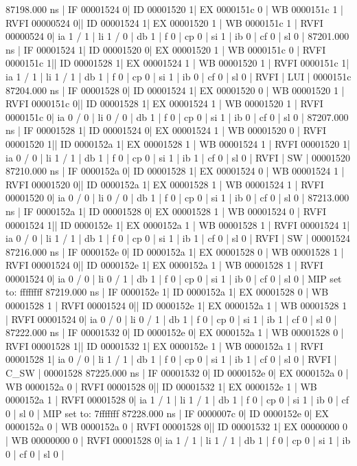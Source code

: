 \begin{terminal}
   87198.000 ns | IF 00001524  0| ID 00001520 1| EX 0000151c 0 | WB 0000151c 1 | RVFI 00000524 0|| ID 00001524  1| EX 00001520 1 | WB 0000151c 1 | RVFI 00000524 0| ia 1 / 1 | li 1 / 0 | db 1 | f 0 | cp 0 | si 1 | ib 0 | cf 0 | sl 0 |
   87201.000 ns | IF 00001524  1| ID 00001520 0| EX 00001520 1 | WB 0000151c 0 | RVFI 0000151c 1|| ID 00001528  1| EX 00001524 1 | WB 00001520 1 | RVFI 0000151c 1| ia 1 / 1 | li 1 / 1 | db 1 | f 0 | cp 0 | si 1 | ib 0 | cf 0 | sl 0 | RVFI | LUI      | 0000151c
   87204.000 ns | IF 00001528  0| ID 00001524 1| EX 00001520 0 | WB 00001520 1 | RVFI 0000151c 0|| ID 00001528  1| EX 00001524 1 | WB 00001520 1 | RVFI 0000151c 0| ia 0 / 0 | li 0 / 0 | db 1 | f 0 | cp 0 | si 1 | ib 0 | cf 0 | sl 0 |
   87207.000 ns | IF 00001528  1| ID 00001524 0| EX 00001524 1 | WB 00001520 0 | RVFI 00001520 1|| ID 0000152a  1| EX 00001528 1 | WB 00001524 1 | RVFI 00001520 1| ia 0 / 0 | li 1 / 1 | db 1 | f 0 | cp 0 | si 1 | ib 1 | cf 0 | sl 0 | RVFI | SW       | 00001520
   87210.000 ns | IF 0000152a  0| ID 00001528 1| EX 00001524 0 | WB 00001524 1 | RVFI 00001520 0|| ID 0000152a  1| EX 00001528 1 | WB 00001524 1 | RVFI 00001520 0| ia 0 / 0 | li 0 / 0 | db 1 | f 0 | cp 0 | si 1 | ib 0 | cf 0 | sl 0 |
   87213.000 ns | IF 0000152a  1| ID 00001528 0| EX 00001528 1 | WB 00001524 0 | RVFI 00001524 1|| ID 0000152e  1| EX 0000152a 1 | WB 00001528 1 | RVFI 00001524 1| ia 0 / 0 | li 1 / 1 | db 1 | f 0 | cp 0 | si 1 | ib 1 | cf 0 | sl 0 | RVFI | SW       | 00001524
   87216.000 ns | IF 0000152e  0| ID 0000152a 1| EX 00001528 0 | WB 00001528 1 | RVFI 00001524 0|| ID 0000152e  1| EX 0000152a 1 | WB 00001528 1 | RVFI 00001524 0| ia 0 / 0 | li 0 / 1 | db 1 | f 0 | cp 0 | si 1 | ib 0 | cf 0 | sl 0 |
MIP set to: ffffffff
   87219.000 ns | IF 0000152e  1| ID 0000152a 1| EX 00001528 0 | WB 00001528 1 | RVFI 00001524 0|| ID 0000152e  1| EX 0000152a 1 | WB 00001528 1 | RVFI 00001524 0| ia 0 / 0 | li 0 / 1 | db 1 | f 0 | cp 0 | si 1 | ib 1 | cf 0 | sl 0 |
   87222.000 ns | IF 00001532  0| ID 0000152e 0| EX 0000152a 1 | WB 00001528 0 | RVFI 00001528 1|| ID 00001532  1| EX 0000152e 1 | WB 0000152a 1 | RVFI 00001528 1| ia 0 / 0 | li 1 / 1 | db 1 | f 0 | cp 0 | si 1 | ib 1 | cf 0 | sl 0 | RVFI | C_SW     | 00001528
   87225.000 ns | IF 00001532  0| ID 0000152e 0| EX 0000152a 0 | WB 0000152a 0 | RVFI 00001528 0|| ID 00001532  1| EX 0000152e 1 | WB 0000152a 1 | RVFI 00001528 0| ia 1 / 1 | li 1 / 1 | db 1 | f 0 | cp 0 | si 1 | ib 0 | cf 0 | sl 0 |
MIP set to: 7fffffff
   87228.000 ns | IF 0000007c  0| ID 0000152e 0| EX 0000152a 0 | WB 0000152a 0 | RVFI 00001528 0|| ID 00001532  1| EX 00000000 0 | WB 00000000 0 | RVFI 00001528 0| ia 1 / 1 | li 1 / 1 | db 1 | f 0 | cp 0 | si 1 | ib 0 | cf 0 | sl 0 |
\end{terminal}



